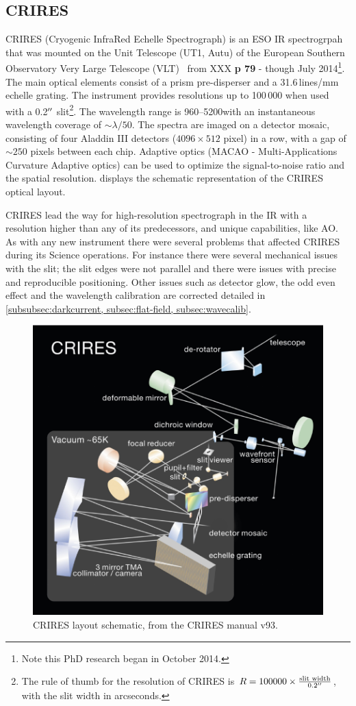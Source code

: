 \subsection{CRIRES}
CRIRES (Cryogenic InfraRed Echelle Spectrograph) is an ESO IR spectrogrpah that was mounted on the Unit Telescope (UT1, Autu) of the European Southern Observatory Very Large Telescope (VLT)~\citep{kaeufl 2004 } from XXX \textbf{p 79} - though July 2014\footnote{Note this PhD research began in October 2014.}.
The main optical elements consist of a prism pre-disperser and a 31.6\,lines/mm echelle grating.
The instrument provides resolutions up to 100\,000 when used with a 0.2$^{\prime\prime}$ slit\footnote{The rule of thumb for the resolution of CRIRES is \(R = 100000 \times \frac{\textrm{slit width}}{0.2^{\prime\prime}}\), with the slit width in arcseconds.}.
The wavelength range is 960--5200\nm with an instantaneous wavelength coverage of \(\sim \lambda/50\). The spectra are imaged on a detector mosaic, consisting of four Aladdin III detectors (\(4096 \times 512\) pixel) in a row, with a gap of \(\sim 250\) pixels between each chip.
Adaptive optics (MACAO - Multi-Applications Curvature Adaptive optics) can be used to optimize the signal-to-noise ratio and the spatial resolution.
 displays the schematic representation of the CRIRES optical layout.

CRIRES lead the way for high-resolution spectrograph in the IR with a resolution higher than any of its predecessors, and unique capabilities, like AO. As with any new instrument there were several problems that affected CRIRES during its Science operations. For instance there were several mechanical issues with the slit; the slit edges were not parallel and there were issues with precise and reproducible positioning. Other issues such as detector glow, the odd even effect and the wavelength calibration are corrected detailed in \cref{subsubsec:darkcurrent, subsec:flat-field, subsec:wavecalib}.


\begin{figure}
    \centering
    \includegraphics[width=0.7\linewidth]{figures/advanced_material/CRIRES_schematic.pdf}
    \caption{CRIRES layout schematic, from the CRIRES manual v93.}
    \label{fig:criresschematic}
\end{figure}



